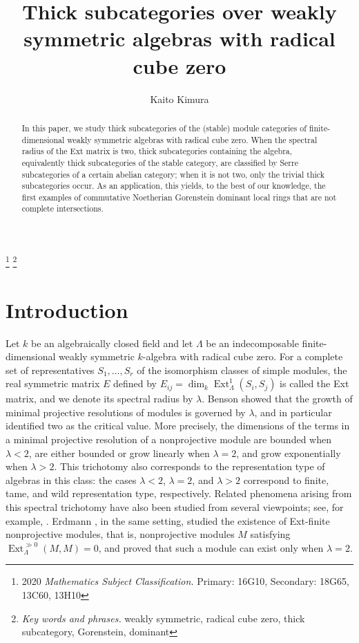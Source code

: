 \documentclass{amsart}
\theoremstyle{definition}
\theoremstyle{remark}
\numberwithin{equation}{thm}
\def\dim{\operatorname{dim}}
\def\Ext{\operatorname{Ext}}
\def\L{\Lambda}
\begin{document}
\allowdisplaybreaks

\title{Thick subcategories over weakly symmetric algebras with radical cube zero}
\author{Kaito Kimura}
\address{Department of Mathematics, Purdue University, 150 N. University Street, West Lafayette, IN 47907, USA}
\thanks{2020 {\em Mathematics Subject Classification.} Primary: 16G10, Secondary: 18G65, 13C60, 13H10}
\thanks{{\em Key words and phrases.} weakly symmetric, radical cube zero, thick subcategory, Gorenstein, dominant}

\begin{abstract} 
In this paper, we study thick subcategories of the (stable) module categories of finite-dimensional weakly symmetric algebras with radical cube zero.
When the spectral radius of the Ext matrix is two, thick subcategories containing the algebra, equivalently thick subcategories of the stable category, are classified by Serre subcategories of a certain abelian category; when it is not two, only the trivial thick subcategories occur.
As an application, this yields, to the best of our knowledge, the first examples of commutative Noetherian Gorenstein dominant local rings that are not complete intersections.
\end{abstract}

\maketitle

\section{Introduction}

Let $k$ be an algebraically closed field and let $\L$ be an indecomposable finite-dimensional weakly symmetric $k$-algebra with radical cube zero.
For a complete set of representatives $S_1,\ldots,S_r$ of the isomorphism classes of simple modules, the real symmetric matrix $E$ defined by $E_{ij}=\dim_k\Ext_\L^1(S_i,S_j)$ is called the Ext matrix, and we denote its spectral radius by $\lambda$.
Benson \cite{Ben} showed that the growth of minimal projective resolutions of modules is governed by $\lambda$, and in particular identified two as the critical value.
More precisely, the dimensions of the terms in a minimal projective resolution of a nonprojective module are bounded when $\lambda<2$, are either bounded or grow linearly when $\lambda=2$, and grow exponentially when $\lambda>2$.
This trichotomy also corresponds to the representation type of algebras in this class: the cases $\lambda<2$, $\lambda=2$, and $\lambda>2$ correspond to finite, tame, and wild representation type, respectively.
Related phenomena arising from this spectral trichotomy have also been studied from several viewpoints; see, for example, \cite{ESc,ESo2,ESo}.
Erdmann \cite{E}, in the same setting, studied the existence of Ext-finite nonprojective modules, that is, nonprojective modules $M$ satisfying $\Ext_\L^{\gg 0}(M,M)=0$, and proved that such a module can exist only when $\lambda=2$.
\end{document}
